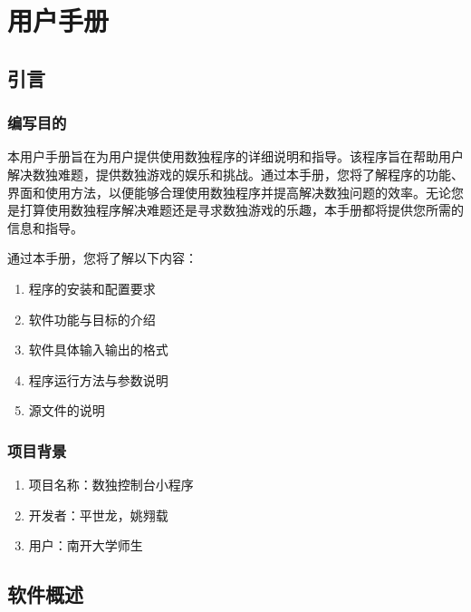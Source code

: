 \documentclass[a4paper]{article}
\begin{document}
\section{用户手册}
\subsection{引言}
\subsubsection{编写目的}
本用户手册旨在为用户提供使用数独程序的详细说明和指导。该程序旨在帮助用户解决数独难题，提供数独游戏的娱乐和挑战。通过本手册，您将了解程序的功能、界面和使用方法，以便能够合理使用数独程序并提高解决数独问题的效率。无论您是打算使用数独程序解决难题还是寻求数独游戏的乐趣，本手册都将提供您所需的信息和指导。

通过本手册，您将了解以下内容：
\begin{enumerate}
\item 程序的安装和配置要求
\item 软件功能与目标的介绍
\item 软件具体输入输出的格式
\item 程序运行方法与参数说明
\item 源文件的说明
\end{enumerate}
\subsubsection{项目背景}
\begin{enumerate}
\item 项目名称：数独控制台小程序
\item 开发者：平世龙，姚翙载
\item 用户：南开大学师生
\end{enumerate}
\subsection{软件概述}
\end{document}
